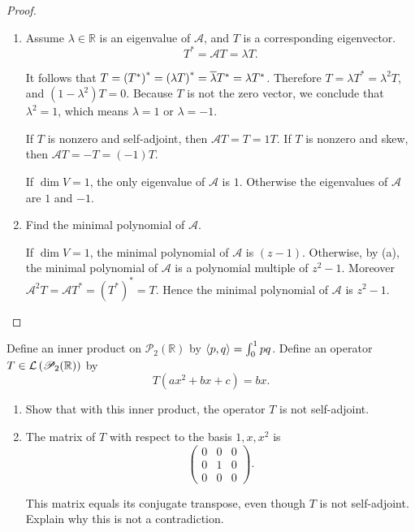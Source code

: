 \begin{proof}
    \begin{enumerate}[label={(\alph*)}]
        \item Assume $\lambda\in\mathbb{R}$ is an eigenvalue of $\mathcal{A}$, and $T$ is a corresponding eigenvector.
              \[
                  T^{*} = \mathcal{A}T = \lambda T.
              \]

              It follows that $T = {(T^{*})}^{*} = {(\lambda T)}^{*} = \overline{\lambda}T^{*} = \lambda T^{*}$. Therefore $T = \lambda T^{*} = \lambda^{2}T$, and $(1 - \lambda^{2})T = 0$. Because $T$ is not the zero vector, we conclude that $\lambda^{2} = 1$, which means $\lambda = 1$ or $\lambda = -1$.

              If $T$ is nonzero and self-adjoint, then $\mathcal{A}T = T = 1T$. If $T$ is nonzero and skew, then $\mathcal{A}T = -T = (-1)T$.

              If $\dim V = 1$, the only eigenvalue of $\mathcal{A}$ is $1$. Otherwise the eigenvalues of $\mathcal{A}$ are $1$ and $-1$.
        \item Find the minimal polynomial of $\mathcal{A}$.

              If $\dim V = 1$, the minimal polynomial of $\mathcal{A}$ is $(z - 1)$. Otherwise, by (a), the minimal polynomial of $\mathcal{A}$ is a polynomial multiple of $z^{2} - 1$. Moreover $\mathcal{A}^{2}T = \mathcal{A}T^{*} = {(T^{*})}^{*} = T$. Hence the minimal polynomial of $\mathcal{A}$ is $z^{2} - 1$.
    \end{enumerate}
\end{proof}
\newpage

\begin{exercise}
    Define an inner product on $\mathscr{P}_{2}(\mathbb{R})$ by $\left\langle{p, q}\right\rangle = \int^{1}_{0}pq$. Define an operator $T\in\mathcal{L}\left({\mathscr{P}_{2}(\mathbb{R})}\right)$ by
    \[
        T(ax^{2} + bx + c) = bx.
    \]

    \begin{enumerate}[label={(\alph*)}]
        \item Show that with this inner product, the operator $T$ is not self-adjoint.
        \item The matrix of $T$ with respect to the basis $1, x, x^{2}$ is
              \[
                  \begin{pmatrix}
                      0 & 0 & 0 \\
                      0 & 1 & 0 \\
                      0 & 0 & 0
                  \end{pmatrix}.
              \]

              This matrix equals its conjugate transpose, even though $T$ is not self-adjoint. Explain why this is not a contradiction.
    \end{enumerate}
\end{exercise}

